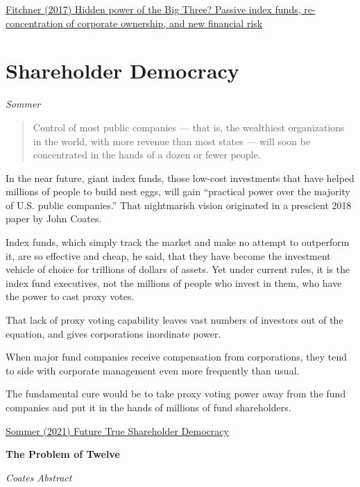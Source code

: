 \documentclass[
]{book}
\begin{document}
\href{https://www.cambridge.org/core/journals/business-and-politics/article/hidden-power-of-the-big-three-passive-index-funds-reconcentration-of-corporate-ownership-and-new-financial-risk/30AD689509AAD62F5B677E916C28C4B6}{Fitchner (2017) Hidden power of the Big Three? Passive index funds, re-concentration of corporate ownership, and new financial risk}

\hypertarget{shareholder-democracy}{%
\section{Shareholder Democracy}\label{shareholder-democracy}}

\emph{Sommer}

\begin{quote}
Control of most public companies ---
that is, the wealthiest organizations in the world,
with more revenue than most states ---
will soon be concentrated in the hands of a dozen or fewer people.
\end{quote}

In the near future, giant index funds, those low-cost investments that have helped millions of people to build nest eggs, will gain ``practical power over the majority of U.S. public companies.''
That nightmarish vision originated in a prescient 2018 paper by John Coates.

Index funds, which simply track the market and make no attempt to outperform it, are so effective and cheap, he said, that they have become the investment vehicle of choice for trillions of dollars of assets. Yet under current rules, it is the index fund executives, not the millions of people who invest in them, who have the power to cast proxy votes.

That lack of proxy voting capability leaves vast numbers of investors out of the equation, and gives corporations inordinate power.

When major fund companies receive compensation from corporations, they tend to side with corporate management even more frequently than usual.

The fundamental cure would be to take proxy voting power away from the fund companies and put it in the hands of millions of fund shareholders.

\href{https://www.nytimes.com/2021/05/21/business/stock-funds-shareholder-democracy.html}{Sommer (2021) Future True Shareholder Democracy}

\textbf{The Problem of Twelve}

\emph{Coates Abstract}
\end{document}
